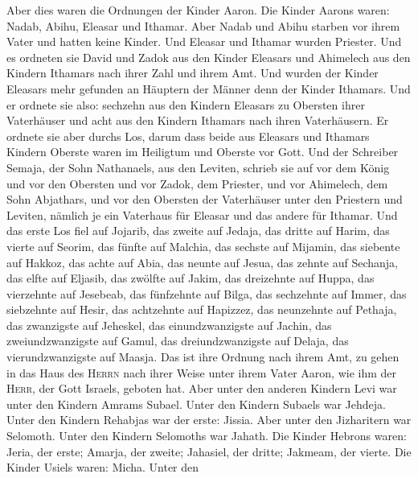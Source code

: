  Aber dies waren die Ordnungen der Kinder Aaron. Die
Kinder Aarons waren: Nadab, Abihu, Eleasar und Ithamar. 
Aber Nadab und Abihu starben vor ihrem Vater und hatten keine Kinder.
Und Eleasar und Ithamar wurden Priester.  Und es ordneten
sie David und Zadok aus den Kinder Eleasars und Ahimelech aus den
Kindern Ithamars nach ihrer Zahl und ihrem Amt.  Und
wurden der Kinder Eleasars mehr gefunden an Häuptern der Männer denn der
Kinder Ithamars. Und er ordnete sie also: sechzehn aus den Kindern
Eleasars zu Obersten ihrer Vaterhäuser und acht aus den Kindern Ithamars
nach ihren Vaterhäusern.  Er ordnete sie aber durchs Los,
darum dass beide aus Eleasars und Ithamars Kindern Oberste waren im
Heiligtum und Oberste vor Gott.  Und der Schreiber Semaja,
der Sohn Nathanaels, aus den Leviten, schrieb sie auf vor dem König und
vor den Obersten und vor Zadok, dem Priester, und vor Ahimelech, dem
Sohn Abjathars, und vor den Obersten der Vaterhäuser unter den Priestern
und Leviten, nämlich je ein Vaterhaus für Eleasar und das andere für
Ithamar.  Und das erste Los fiel auf Jojarib, das zweite
auf Jedaja,  das dritte auf Harim, das vierte auf Seorim,
 das fünfte auf Malchia, das sechste auf Mijamin,
 das siebente auf Hakkoz, das achte auf Abia,
 das neunte auf Jesua, das zehnte auf Sechanja,
 das elfte auf Eljasib, das zwölfte auf Jakim,
 das dreizehnte auf Huppa, das vierzehnte auf Jesebeab,
 das fünfzehnte auf Bilga, das sechzehnte auf Immer,
 das siebzehnte auf Hesir, das achtzehnte auf Hapizzez,
 das neunzehnte auf Pethaja, das zwanzigste auf Jeheskel,
 das einundzwanzigste auf Jachin, das zweiundzwanzigste
auf Gamul,  das dreiundzwanzigste auf Delaja, das
vierundzwanzigste auf Maasja.  Das ist ihre Ordnung nach
ihrem Amt, zu gehen in das Haus des \textsc{Herrn} nach ihrer Weise
unter ihrem Vater Aaron, wie ihm der \textsc{Herr}, der Gott Israels,
geboten hat.  Aber unter den anderen Kindern Levi war
unter den Kindern Amrams Subael. Unter den Kindern Subaels war Jehdeja.
 Unter den Kindern Rehabjas war der erste: Jissia.
 Aber unter den Jizharitern war Selomoth. Unter den
Kindern Selomoths war Jahath.  Die Kinder Hebrons waren:
Jeria, der erste; Amarja, der zweite; Jahasiel, der dritte; Jakmeam, der
vierte.  Die Kinder Usiels waren: Micha. Unter den
